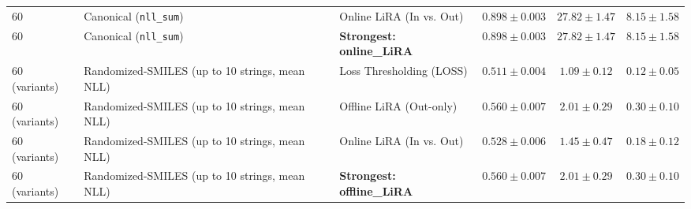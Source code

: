 \begin{table}[t]
{\begin{tabular}{lllccc}
60 & Canonical (\texttt{nll\_sum}) & Online LiRA (In vs. Out) & $0.898 \pm 0.003$ & $27.82 \pm 1.47$ & $8.15 \pm 1.58$ \\
60 & Canonical (\texttt{nll\_sum}) & \textbf{Strongest: online\_LiRA} & \textbf{$0.898 \pm 0.003$} & \textbf{$27.82 \pm 1.47$} & \textbf{$8.15 \pm 1.58$} \\
\midrule
60 (variants) & Randomized-SMILES (up to 10 strings, mean NLL) & Loss Thresholding (LOSS) & $0.511 \pm 0.004$ & $1.09 \pm 0.12$ & $0.12 \pm 0.05$ \\
60 (variants) & Randomized-SMILES (up to 10 strings, mean NLL) & Offline LiRA (Out-only) & $0.560 \pm 0.007$ & $2.01 \pm 0.29$ & $0.30 \pm 0.10$ \\
60 (variants) & Randomized-SMILES (up to 10 strings, mean NLL) & Online LiRA (In vs. Out) & $0.528 \pm 0.006$ & $1.45 \pm 0.47$ & $0.18 \pm 0.12$ \\
60 (variants) & Randomized-SMILES (up to 10 strings, mean NLL) & \textbf{Strongest: offline\_LiRA} & \textbf{$0.560 \pm 0.007$} & \textbf{$2.01 \pm 0.29$} & \textbf{$0.30 \pm 0.10$} \\
\bottomrule
\end{tabular}%
}
\end{table}
